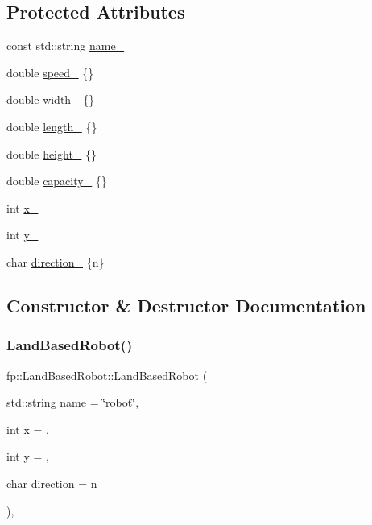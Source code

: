 \subsection*{Protected Attributes}
\begin{DoxyCompactItemize}
\item 
const std\+::string \hyperlink{classfp_1_1_land_based_robot_a548e8bdaead3c8ddbcaa9eac1121d1c5}{name\+\_\+}
\item 
double \hyperlink{classfp_1_1_land_based_robot_ae969157e5f910ed0a85198dc7f6c3cef}{speed\+\_\+} \{\}
\item 
double \hyperlink{classfp_1_1_land_based_robot_aae605323e9ce63f29dcded204421b1fc}{width\+\_\+} \{\}
\item 
double \hyperlink{classfp_1_1_land_based_robot_a9475d5886f329c92e68f0d86b4da58c0}{length\+\_\+} \{\}
\item 
double \hyperlink{classfp_1_1_land_based_robot_a34238a27d9055c416a3e6cfedc8ed248}{height\+\_\+} \{\}
\item 
double \hyperlink{classfp_1_1_land_based_robot_a542d90c7c62899e3c3cf28791bbb6c8e}{capacity\+\_\+} \{\}
\item 
int \hyperlink{classfp_1_1_land_based_robot_a55c2b5865fd60fb0158a135031f8b271}{x\+\_\+}
\item 
int \hyperlink{classfp_1_1_land_based_robot_a130cfd6ad383116076dc891ee3a52671}{y\+\_\+}
\item 
char \hyperlink{classfp_1_1_land_based_robot_adc8e6123fa8ffe86576e46000b0ae779}{direction\+\_\+} \{\textquotesingle{}n\textquotesingle{}\}
\end{DoxyCompactItemize}


\subsection{Constructor \& Destructor Documentation}
\mbox{\label{classfp_1_1_land_based_robot_a08abaf52a0b6968a8dfce230a47adca7}} 
\subsubsection{\texorpdfstring{Land\+Based\+Robot()}{LandBasedRobot()}}
{\footnotesize\ttfamily fp\+::\+Land\+Based\+Robot\+::\+Land\+Based\+Robot (\begin{DoxyParamCaption}\item[{std\+::string}]{name = {\ttfamily \char`\"{}robot\char`\"{}},  }\item[{int}]{x = {},  }\item[{int}]{y = {},  }\item[{char}]{direction = {\ttfamily \textquotesingle{}n\textquotesingle{}} }\end{DoxyParamCaption})\hspace{0.3cm}{\ttfamily [inline]}, {\ttfamily [explicit]}}

